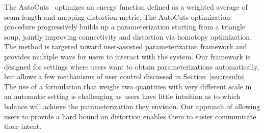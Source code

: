 %

The AutoCuts~\cite{Poranne2017Autocuts} optimizes an energy function defined as a weighted average of seam length and mapping distortion metric. The AutoCuts optimization procedure progressively builds up a parameterization starting from a triangle soup, jointly improving connectivity and distortion via homotopy optimization. 
The method is targeted toward user-assisted parameterization framework and provides multiple ways for users to interact with the system. Our framework is designed for settings where users want to obtain parameterizations automatically, but allows a few mechanisms of user control discussed in Section~\ref{sec:results}.  
The use of a formulation that weighs two quantities with very different scale in an automatic setting is challenging as users have little intuition as to which balance will achieve the parameterization they envision. Our approach of allowing users to provide a hard bound on distortion enables them to easier communicate their intent. 
%

